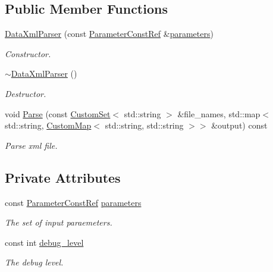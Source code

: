 \subsection*{Public Member Functions}
\begin{DoxyCompactItemize}
\item 
\hyperlink{classDataXmlParser_a61f895e7ddc005480a5941d41d7f0e9a}{Data\+Xml\+Parser} (const \hyperlink{Parameter_8hpp_a37841774a6fcb479b597fdf8955eb4ea}{Parameter\+Const\+Ref} \&\hyperlink{classDataXmlParser_a3a2edee0d7d535f8e014154f791d1055}{parameters})
\begin{DoxyCompactList}\small\item\em Constructor. \end{DoxyCompactList}\item 
\hyperlink{classDataXmlParser_aceaed5bce88113f28b3db70774c5c577}{$\sim$\+Data\+Xml\+Parser} ()
\begin{DoxyCompactList}\small\item\em Destructor. \end{DoxyCompactList}\item 
void \hyperlink{classDataXmlParser_a3f071ae4083e3a512e771502f89c7fab}{Parse} (const \hyperlink{custom__set_8hpp_a615bc2f42fc38a4bb1790d12c759e86f}{Custom\+Set}$<$ std\+::string $>$ \&file\+\_\+names, std\+::map$<$ std\+::string, \hyperlink{custom__map_8hpp_a18ca01763abbe3e5623223bfe5aaac6b}{Custom\+Map}$<$ std\+::string, std\+::string $>$$>$ \&output) const
\begin{DoxyCompactList}\small\item\em Parse xml file. \end{DoxyCompactList}\end{DoxyCompactItemize}
\subsection*{Private Attributes}
\begin{DoxyCompactItemize}
\item 
const \hyperlink{Parameter_8hpp_a37841774a6fcb479b597fdf8955eb4ea}{Parameter\+Const\+Ref} \hyperlink{classDataXmlParser_a3a2edee0d7d535f8e014154f791d1055}{parameters}
\begin{DoxyCompactList}\small\item\em The set of input paraemeters. \end{DoxyCompactList}\item 
const int \hyperlink{classDataXmlParser_ae22bf236ffba691665a432b0150c14e8}{debug\+\_\+level}
\begin{DoxyCompactList}\small\item\em The debug level. \end{DoxyCompactList}\end{DoxyCompactItemize}


